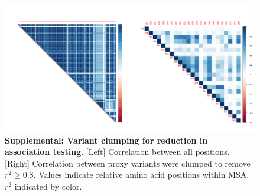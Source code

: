 \documentclass[9pt,lineno]{elife}  %
\begin{document}
\begin{figure}[ht] \hspace{-0.5cm} 
    \includegraphics[scale=0.85]{S1}
	\caption{\textbf{Supplemental: Variant clumping for reduction in association testing}. [Left] Correlation between all positions. [Right] Correlation between proxy variants were clumped to remove $r^2 \ge 0.8$. Values indicate relative amino acid positions within MSA. $r^2$ indicated by color.}
	\label{fig:clumping}
\end{figure}
\end{document}
